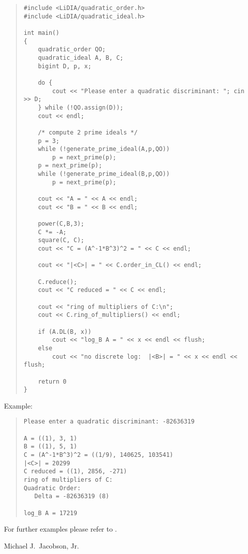 \begin{quote}
\begin{verbatim}
#include <LiDIA/quadratic_order.h>
#include <LiDIA/quadratic_ideal.h>

int main()
{
    quadratic_order QO;
    quadratic_ideal A, B, C;
    bigint D, p, x;

    do {
        cout << "Please enter a quadratic discriminant: "; cin >> D;
    } while (!QO.assign(D));
    cout << endl;

    /* compute 2 prime ideals */
    p = 3;
    while (!generate_prime_ideal(A,p,QO))
        p = next_prime(p);
    p = next_prime(p);
    while (!generate_prime_ideal(B,p,QO))
        p = next_prime(p);

    cout << "A = " << A << endl;
    cout << "B = " << B << endl;

    power(C,B,3);
    C *= -A;
    square(C, C);
    cout << "C = (A^-1*B^3)^2 = " << C << endl;

    cout << "|<C>| = " << C.order_in_CL() << endl;

    C.reduce();
    cout << "C reduced = " << C << endl;

    cout << "ring of multipliers of C:\n";
    cout << C.ring_of_multipliers() << endl;

    if (A.DL(B, x))
        cout << "log_B A = " << x << endl << flush;
    else
        cout << "no discrete log:  |<B>| = " << x << endl << flush;

    return 0
}
\end{verbatim}
\end{quote}

Example:
\begin{quote}
\begin{verbatim}
Please enter a quadratic discriminant: -82636319

A = ((1), 3, 1)
B = ((1), 5, 1)
C = (A^-1*B^3)^2 = ((1/9), 140625, 103541)
|<C>| = 20299
C reduced = ((1), 2856, -271)
ring of multipliers of C:
Quadratic Order:
   Delta = -82636319 (8)

log_B A = 17219
\end{verbatim}
\end{quote}

For further examples please refer to
.



\AUTHOR

Michael J.~Jacobson, Jr.
